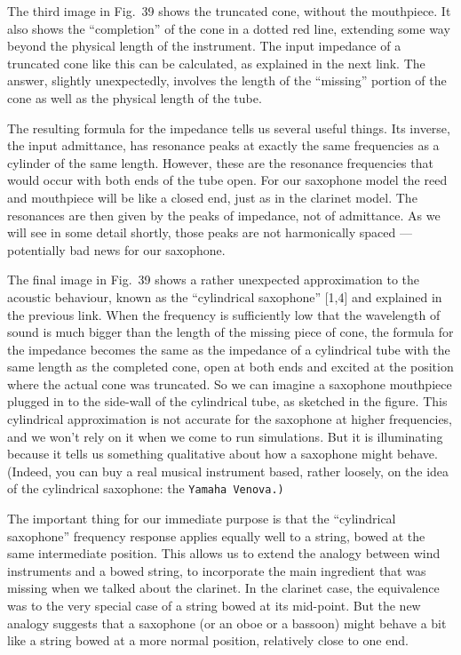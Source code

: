 
  The third image in Fig.\ 39 shows the truncated cone, without the mouthpiece. 
  It also shows the “completion” of the cone in a dotted red line, extending 
  some way beyond the physical length of the instrument. The input impedance of 
  a truncated cone like this can be calculated, as explained in the next link. 
  The answer, slightly unexpectedly, involves the length of the “missing” 
  portion of the cone as well as the physical length of the tube. 

  The resulting formula for the impedance tells us several useful things. Its 
  inverse, the input admittance, has resonance peaks at exactly the same 
  frequencies as a cylinder of the same length. However, these are the 
  resonance frequencies that would occur with both ends of the tube open. For 
  our saxophone model the reed and mouthpiece will be like a closed end, just 
  as in the clarinet model. The resonances are then given by the peaks of 
  impedance, not of admittance. As we will see in some detail shortly, those 
  peaks are not harmonically spaced — potentially bad news for our saxophone. 

  The final image in Fig.\ 39 shows a rather unexpected approximation to the 
  acoustic behaviour, known as the “cylindrical saxophone” [1,4] and explained 
  in the previous link. When the frequency is sufficiently low that the 
  wavelength of sound is much bigger than the length of the missing piece of 
  cone, the formula for the impedance becomes the same as the impedance of a 
  cylindrical tube with the same length as the completed cone, open at both 
  ends and excited at the position where the actual cone was truncated. So we 
  can imagine a saxophone mouthpiece plugged in to the side-wall of the 
  cylindrical tube, as sketched in the figure. This cylindrical approximation 
  is not accurate for the saxophone at higher frequencies, and we won’t rely on 
  it when we come to run simulations. But it is illuminating because it tells 
  us something qualitative about how a saxophone might behave. (Indeed, you can 
  buy a real musical instrument based, rather loosely, on the idea of the 
  cylindrical saxophone: the \tt{}Yamaha Venova\rm{}.) 

  The important thing for our immediate purpose is that the “cylindrical 
  saxophone” frequency response applies equally well to a string, bowed at the 
  same intermediate position. This allows us to extend the analogy between wind 
  instruments and a bowed string, to incorporate the main ingredient that was 
  missing when we talked about the clarinet. In the clarinet case, the 
  equivalence was to the very special case of a string bowed at its mid-point. 
  But the new analogy suggests that a saxophone (or an oboe or a bassoon) might 
  behave a bit like a string bowed at a more normal position, relatively close 
  to one end. 

